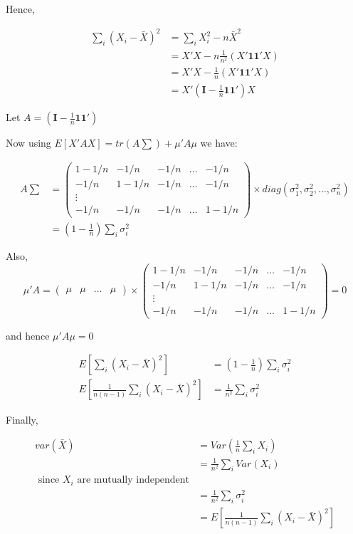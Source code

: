 \documentclass[a4paper]{article}
\begin{document}
Hence,

\begin{align*}
\sum_i(X_i-\bar{X})^2 &= \sum_i X_i^2-n\bar{X}^2\\
&= X'X - n\frac{1}{n^2}(X'\mathbf{11'}X)\\
&= X'X-\frac{1}{n}(X'\mathbf{11'}X)\\
&= X'(\mathbf{I}-\frac{1}{n}\mathbf{11'})X
\end{align*}

Let $A=(\mathbf{I}-\frac{1}{n}\mathbf{11'})$

Now using $E[X'AX]= tr(A\sum) + \mu'A\mu$ we have:

\begin{align*}A\sum &= \begin{pmatrix}1-1/n & -1/n & -1/n & \dots & -1/n\\
-1/n & 1-1/n & -1/n & \dots & -1/n\\
\vdots\\
-1/n & -1/n & -1/n & \dots & 1-1/n
\end{pmatrix}\times diag(\sigma_1^2, \sigma_2^2, \dots, \sigma_n^2)\\ 
&= (1-\frac{1}{n})\sum_i \sigma_i^2
\end{align*}

Also, $$\mu'A = \begin{pmatrix} \mu & \mu & \dots & \mu \end{pmatrix} \times \begin{pmatrix}1-1/n & -1/n & -1/n & \dots & -1/n\\
-1/n & 1-1/n & -1/n & \dots & -1/n\\
\vdots\\
-1/n & -1/n & -1/n & \dots & 1-1/n
\end{pmatrix} = 0$$ 

and hence $\mu'A\mu=0$

\begin{align*}
E[\sum_i(X_i-\bar{X})^2] &= (1-\frac{1}{n})\sum_i \sigma_i^2  \\
E[\frac{1}{n(n-1)}\sum_i(X_i-\bar{X})^2]  &= \frac{1}{n^2} \sum_i \sigma_i^2
\end{align*}

Finally,

\begin{align*}
var(\bar{X}) &= Var(\frac{1}{n}\sum_i X_i)\\
&= \frac{1}{n^2} \sum_i Var(X_i)\\ \text{ since $X_i$ are mutually independent}\\
&= \frac{1}{n^2}\sum_i \sigma_i^2\\
&= E[\frac{1}{n(n-1)}\sum_i(X_i-\bar{X})^2]
\end{align*}
\end{document}
